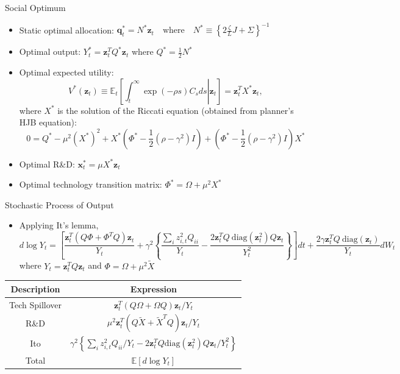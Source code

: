 \documentclass[english,aspectratio=169,handout]{beamer}
\theoremstyle{plain}
\begin{document}
%
\begin{frame}{Social Optimum }

  \label{optimal}
  \begin{itemize}
    \item Static optimal allocation: $\mathbf{q}_{t}^{*}=N^{*}\mathbf{z}_{t}\quad\text{where}\quad N^{*}\equiv\left\{ 2\frac{\zeta}{L}J+\Sigma\right\} ^{-1}$
    \item Optimal output: $Y_{t}^{*}=\mathbf{z}_{t}^{T}Q^{*}\mathbf{z}_{t}$
          where $Q^{*}=\frac{1}{2}N^{*}$
    \item Optimal expected utility:
          \[
            V^{*}\left(\mathbf{z}_{t}\right)\equiv\mathbb{E}_{t}\left[\left.\int_{t}^{\infty}\exp\left(-\rho s\right)C_{s}ds\right|\mathbf{z}_{t}\right]=\mathbf{z}_{t}^{T}X^{*}\mathbf{z}_{t},
          \]
          where $X^{*}$ is the solution of the Riccati equation (obtained
          from planner's HJB equation):
          \[
            0=Q^{*}-\mu^{2}\left(X^{*}\right)^{2}+X^{*}\left(\Phi^{*}-\frac{1}{2}\left(\rho-\gamma^{2}\right)I\right)+\left(\Phi^{*}-\frac{1}{2}\left(\rho-\gamma^{2}\right)I\right)X^{*}
          \]
    \item Optimal R\&D: $\mathbf{x}_{t}^{*}=\mu X^{*}\mathbf{z}_{t}$
    \item Optimal technology transition matrix: $\Phi^{*}=\Omega+\mu^{2}X^{*}$
  \end{itemize}
  \hyperlink{aggregation}{}
\end{frame}
%
\begin{frame}{Stochastic Process of Output}

  \label{Y_process}
  \begin{itemize}
    \item Applying It's lemma, {\small
          \[
            d\log Y_{t}=\left[\frac{\mathbf{z}_{t}^{T}\left(Q\Phi+\Phi^{T}Q\right)\mathbf{z}_{t}}{Y_{t}}+\gamma^{2}\left\{ \frac{\sum_{i}z_{i,t}^{2}Q_{ii}}{Y_{t}}-\frac{2\mathbf{z}_{t}^{T}Q\ \text{diag}\left(\mathbf{z}_{t}^{2}\right)Q\mathbf{z}_{t}}{Y_{t}^{2}}\right\} \right]dt+\frac{2\gamma\mathbf{z}_{t}^{T}Q\ \text{diag}\left(\mathbf{z}_{t}\right)}{Y_{t}}dW_{t}
          \]
          }where $Y_{t}=\mathbf{z}_{t}^{T}Q\mathbf{z}_{t}$ and $\Phi=\Omega+\mu^{2}\widetilde{X}$
  \end{itemize}
  \begin{center}
    \begin{tabular}{cc}
      \hline
      \hline Description & Expression\tabularnewline
      \hline
      Tech Spillover     & $\mathbf{z}_{t}^{T}\left(Q\Omega+\Omega Q\right)\mathbf{z}_{t}/Y_{t}$\tabularnewline
      R\&D               & $\mu^{2}\mathbf{z}_{t}^{T}\left(Q\widetilde{X}+\widetilde{X}^{T}Q\right)\mathbf{z}_{t}/Y_{t}$\tabularnewline
      Ito                & $\gamma^{2}\left\{ \sum_{i}z_{i,t}^{2}Q_{ii}/Y_{t}-2\mathbf{z}_{t}^{T}Q\text{diag}\left(\mathbf{z}_{t}^{2}\right)Q\mathbf{z}_{t}/Y_{t}^{2}\right\} $\tabularnewline
      \hline
      Total              & $\mathbb{E}\left[d\log Y_{t}\right]$\tabularnewline
      \hline
    \end{tabular}
    \par\end{center}
\end{frame}
\end{document}
